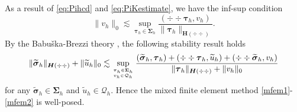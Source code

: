 As a result of \eqref{eq:Pihcd} and \eqref{eq:PiKestimate}, we have the inf-sup condition
\begin{equation*}%
\|v_h\|_0\lesssim \sup_{\boldsymbol{\tau}_h\in\boldsymbol\Sigma_h}\frac{(\div\div\boldsymbol{\tau}_h, v_h)}{\|\boldsymbol{\tau}_h\|_{\boldsymbol{H}(\div{\div })}}.
\end{equation*}
By the Babu{\v{s}}ka-Brezzi theory \cite{BoffiBrezziFortin2013}, the following stability result holds
\begin{equation}\label{eq:discretestability}
\|\widetilde{\boldsymbol{\sigma}}_h\|_{\boldsymbol{H}(\div{\div })}+\|\widetilde{u}_h\|_0\lesssim \sup_{\boldsymbol{\tau}_h\in\boldsymbol\Sigma_h\atop v_h\in\mathcal Q_h}\frac{(\widetilde{\boldsymbol{\sigma}}_h, \boldsymbol{\tau}_h)+(\div\div\boldsymbol{\tau}_h, \widetilde{u}_h)+(\div\div\widetilde{\boldsymbol{\sigma}}_h, v_h)}{\|\boldsymbol{\tau}_h\|_{\boldsymbol{H}(\div{\div })} + \|v_h\|_0}
\end{equation}
for any $\widetilde{\boldsymbol{\sigma}}_h\in\boldsymbol\Sigma_h$ and $\widetilde{u}_h\in\mathcal Q_h$.
Hence the mixed finite element method \eqref{mfem1}-\eqref{mfem2} is well-posed.

